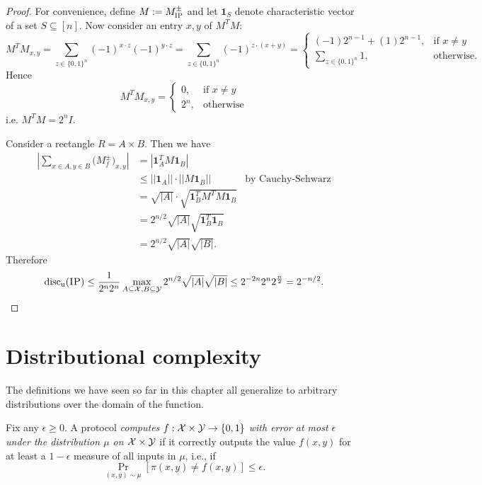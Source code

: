 \begin{proof}
For convenience, define $M:= M^{\pm}_{\textsc{IP}}$ and let $\mathbf{1}_S$ denote characteristic vector of a set $S\subseteq [n]$. Now consider an entry $x,y$ of $M^TM$:
$$M^TM_{x,y} = \sum_{z\in\{0,1\}^n} (-1)^{x\cdot z}(-1)^{y\cdot z} = \sum_{z \in \{0,1\}^n}(-1)^{z\cdot(x+y)} = \begin{cases}
(-1)2^{n-1} + (1)2^{n-1}, &\text{if $x\neq y$} \\
\sum_{z \in \{0,1\}^n}1, &\text{otherwise}.
\end{cases}$$
Hence $$M^TM_{x,y} = \begin{cases}
0, &\text{if $x\neq y$} \\
2^n, &\text{otherwise}
\end{cases}$$
i.e. $M^TM = 2^nI$.

Consider a rectangle $R = A\times B$. Then we have
\begin{align*}
\left| \sum_{x \in A, y \in B} \big(M^{\pm}_f\big)_{x,y} \right|  &= \left| \mathbf{1}_A^T M \mathbf{1}_B\right | \\
&\leq ||\mathbf{1}_A|| \cdot || M\mathbf{1}_B|| &\text{by Cauchy-Schwarz} \\
&= \sqrt{|A|}\cdot\sqrt{\mathbf{1}^T_BM^TM\mathbf{1}_B} \\
&= 2^{n/2}\sqrt{|A|}\sqrt{\mathbf{1}^T_B\mathbf{1}_B} \\
&=2^{n/2}\sqrt{|A|}\sqrt{|B|}.
\end{align*}
Therefore
$$\mathrm{disc_u}(\textsc{IP}) \leq \frac{1}{2^n2^n}\max_{A \subseteq \mathcal{X}, B \subseteq \mathcal{Y}} 2^{n/2}\sqrt{|A|}\sqrt{|B|} \leq 2^{-2n}2^n2^\frac{n}{2} = 2^{-n/2}.$$
\end{proof}


\newpage \section{Distributional complexity}

The definitions we have seen so far in this chapter all generalize to arbitrary distributions over the domain of the function.

\begin{definition}
Fix any $\epsilon \ge 0$. A protocol \emph{computes} $f : \mathcal{X} \times \mathcal{Y} \to \{0,1\}$ \emph{with error at most $\epsilon$ under the distribution $\mu$ on $\mathcal{X} \times \mathcal{Y}$} if it correctly outputs the value $f(x,y)$ for at least a $1-\epsilon$ measure of all inputs in $\mu$, i.e., if
\[
\Pr_{(x,y) \sim \mu}[ \pi(x,y) \neq f(x,y) ] \le \epsilon.
\]
\end{definition}

